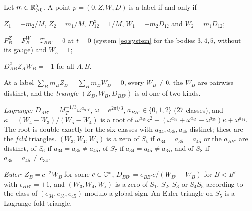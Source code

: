 \begin{lemma}\label{lem:d2-fibre}
Let $m\in\mathbb{R}_{>0}^5$.  A point $p=(0,Z,W,D)$ is a label if and only if
\begin{alphalist}
  \item $Z_1=-m_2/M$, $Z_2=m_1/M$, $D_{12}^3=1/M$, $W_1=-m_2D_{12}$ and $W_2=m_1D_{12}$;
  \item $F^Z_B=F^W_B=T_{BB'}=0$ at $t=0$ (system \eqref{eq:system} for the bodies $3,4,5$,
  without its gauge) and $W_5=1$;
  \item $D_{AB}^2Z_AW_B=-1$ for all $A,B$.
\end{alphalist}
At a label $\sum_Bm_BZ_B=\sum_Bm_BW_B=0$, every $W_B\ne0$, the $W_B$ are pairwise distinct, and
the \emph{triangle} $(Z_B,W_B,D_{BB'})$ is of one of two kinds.
\begin{romanlist}
  \item \emph{Lagrange:} $D_{BB'}=M_T^{-1/3}\omega^{a_{BB'}}$, $\omega=e^{2\pi i/3}$,
  $a_{BB'}\in\{0,1,2\}$ ($27$ classes), and $\kappa=(W_4-W_3)/(W_5-W_4)$ is a root of
  $\omega^{a_{45}}\kappa^2+(\omega^{a_{34}}+\omega^{a_{45}}-\omega^{a_{35}})\kappa+\omega^{a_{34}}$.
  The root is double exactly for the six classes with $a_{34},a_{35},a_{45}$ distinct; these are
  the \emph{fold} triangles.  $(W_3,W_4,W_5)$ is a zero of $S_5$ if $a_{34}=a_{35}=a_{45}$ or the
  $a_{BB'}$ are distinct, of $S_6$ if $a_{34}=a_{35}\ne a_{45}$, of $S_7$ if
  $a_{34}=a_{45}\ne a_{35}$, and of $S_8$ if $a_{35}=a_{45}\ne a_{34}$.
  \item \emph{Euler:} $Z_B=c^{-2}W_B$ for some $c\in\mathbb{C}^*$, $D_{BB'}=e_{BB'}c/(W_{B'}-W_B)$ for
  $B<B'$ with $e_{BB'}=\pm1$, and $(W_3,W_4,W_5)$ is a zero of $S_1$, $S_2$, $S_3$ or $S_4S_5$
  according to the class of $(e_{34},e_{35},e_{45})$ modulo a global sign.  An Euler triangle on
  $S_5$ is a Lagrange fold triangle.
\end{romanlist}
\end{lemma}

